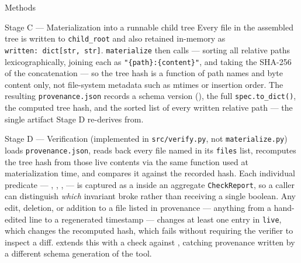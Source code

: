 \documentclass[
  ignorenonframetext,
]{beamer}
\begin{document}
\begin{frame}{Methods}
\begin{block}{Stage C --- Materialization into a runnable child tree}
Every file in the assembled tree is written to \texttt{child\_root} and
also retained in-memory as \texttt{written:\ dict{[}str,\ str{]}}.
\texttt{materialize} then calls
 --- sorting all
relative paths lexicographically, joining each as
\texttt{"\{path\}:\{content\}"}, and taking the SHA-256 of the
concatenation --- so the tree hash is a function of path names and byte
content only, not file-system metadata such as mtimes or insertion
order. The resulting \texttt{provenance.json} records a schema version
(), the full
\texttt{spec.to\_dict()}, the computed tree hash, and the sorted list of
every written relative path --- the single artifact Stage D re-derives
from.
\end{block}

\begin{block}{Stage D --- Verification}
\protect{}\label{stage-d-verification}
 (implemented in
\texttt{src/verify.py}, not \texttt{materialize.py}) loads
\texttt{provenance.json}, reads back every file named in its
\texttt{files} list, recomputes the tree hash from those live contents
via the same  function used at
materialization time, and compares it against the recorded hash. Each
individual predicate --- ,
, ,
 --- is captured as a
 inside an aggregate
\texttt{CheckReport}, so a caller can distinguish \emph{which} invariant
broke rather than receiving a single boolean. Any edit, deletion, or
addition to a file listed in provenance --- anything from a hand-edited
line to a regenerated timestamp --- changes at least one entry in
\texttt{live}, which changes the recomputed hash, which fails
 without requiring the verifier to inspect a
diff.  extends this with a
 check against
, catching provenance
written by a different schema generation of the tool.
\end{block}


\end{frame}
\end{document}
